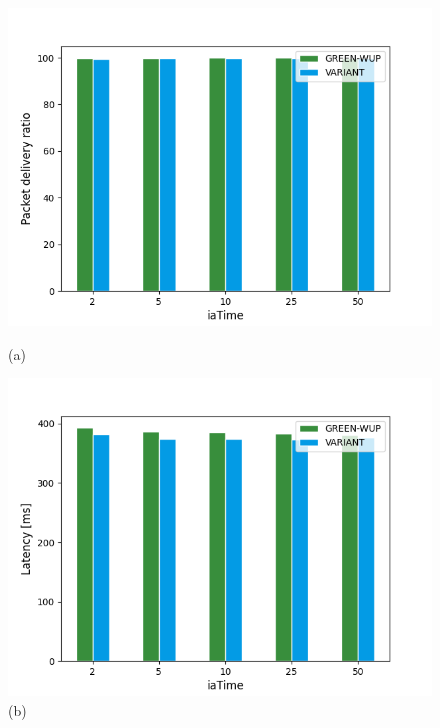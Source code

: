 \documentclass{report}
\begin{document}
\begin{figure}
    \centering
    \begin{minipage}{.5\textwidth}
        \centering
        \includegraphics[width=1\linewidth]{pdr_plot.png}
        \caption*{(a)}
    \end{minipage}%
    \begin{minipage}{.5\textwidth}
        \centering
        \includegraphics[width=1\linewidth]{latency_plot.png}
        \caption*{(b)}
    \end{minipage}
    \begin{minipage}{.5\textwidth}
        \centering

\end{minipage}
\end{figure}
\end{document}
